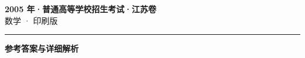 \documentclass[zihao=5, a4paper]{ctexart}
\begin{document}
\begin{center}
  {\Large\bfseries 2005 年·普通高等学校招生考试·江苏卷}\\[4pt]
  {\large 数学 · 印刷版}
\end{center}
\medskip
{}

\par\bigskip\hrule\bigskip
{}
\begin{center}{\large\bfseries 参考答案与详细解析}\end{center}
\smallskip

\end{document}
